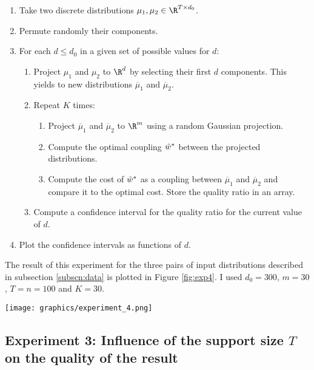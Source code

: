 \documentclass[11pt,a4paper]{article}
\begin{document}
\begin{enumerate}
    \item Take two discrete distributions $\mu_1, \mu_2 \in \R^{T \times d_0}$.
    \item Permute randomly their components.
    \item For each $d\leq d_0$ in a given set of possible values for $d$:
    \begin{enumerate}
        \item Project $\mu_1$ and $\mu_2$ to $\R^d$ by selecting their first $d$ components. This yields to new distributions $\overline{\mu}_1$ and $\overline{\mu}_2$.
        \item Repeat $K$ times:
        \begin{enumerate}
            \item Project $\overline{\mu}_1$ and $\overline{\mu}_2$ to $\R^m$ using a random Gaussian projection.
            \item Compute the optimal coupling $\Tilde{w}^*$ between the projected distributions. 
            \item Compute the cost of $\Tilde{w}^*$ as a coupling between $\overline{\mu}_1$ and $\overline{\mu}_2$ and compare it to the optimal cost. Store the quality ratio in an array.
        \end{enumerate}
        \item Compute a confidence interval for the quality ratio for the current value of $d$.
    \end{enumerate}
    \item Plot the confidence intervals as functions of $d$.
\end{enumerate}

The result of this experiment for the three pairs of input distributions described in subsection \ref{subscn:data} is plotted in Figure \ref{fig:exp4}. I used $d_0=300$, $m=30$, $T=n=100$ and $K=30$.

\begin{figure*}
  \centering
  \texttt{[image: graphics/experiment\_4.png]}
  \caption{Experiment 2: Influence of the original $d$ on the quality of the result}
  \label{fig:exp4}
\end{figure*}


\subsection{Experiment 3: Influence of the support size $T$ on the quality of the result}
\end{document}

